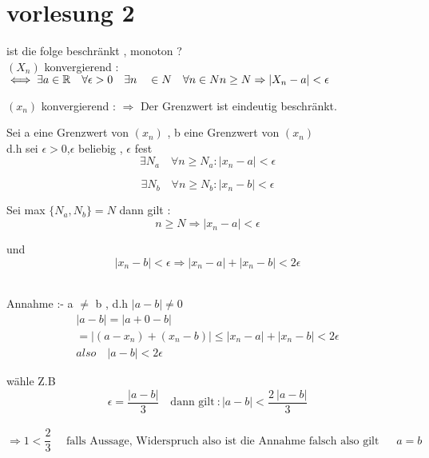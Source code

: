 \section{vorlesung 2}
\begin{text}
    ist die folge beschränkt , monoton ?\\

    $(X_n)$ konvergierend : $\iff \exists a \in\mathbb{R} \quad \forall \epsilon > 0 \quad \exists n \quad \in N \quad \forall n \in N \quad \\
    n \geq N \Rightarrow |X_n - a |< \epsilon $
\end{text}


\begin{theorem}

    $(x_n)$ konvergierend : $\Rightarrow$ Der Grenzwert ist eindeutig beschränkt.

\end{theorem}



\begin{beweis}
    Sei a eine Grenzwert von $(x_n)$ , b eine Grenzwert von $(x_n)$ \\
    d.h sei $\epsilon > 0$,$\epsilon$ beliebig , $\epsilon$ fest \\


    \begin{equation}
        \exists  N_a \quad \forall n \geq N_a : |x_n-a|< \epsilon
    \end{equation}
    

    \begin{equation}
        \exists  N_b \quad \forall n \geq N_b : |x_n-b|< \epsilon
    \end{equation}

    Sei max $\{N_a,N_b\}=N$
    dann gilt : \\
    \begin{equation}
        n \geq N \Rightarrow |x_n - a| < \epsilon
    \end{equation}
    
    und \begin{equation}
            |x_n -b| < \epsilon \Rightarrow |x_n -a|+|x_n - b|< 2\epsilon
    \end{equation}\\
\newpage    

    Annahme :- a $\neq$ b , d.h $|a-b|\neq 0 $
    \begin{gather*}
    |a-b|=|a+0-b|\\
    =|(a-x_n)+(x_n-b)| \leq |x_n - a|+|x_n-b|< 2 \epsilon \\
    also \quad |a - b|< 2 \epsilon
\end{gather*}

 
     wähle Z.B  \[\epsilon = \frac{|a-b|}{3}
        \quad
         \text{dann gilt}\ :|a-b|< \frac{2 \ |a-b|}{3}\]\\

        \[ \Rightarrow 1 < \frac{2}{3} \quad  \text{ falls  Aussage, Widerspruch  also  ist  die  Annahme  falsch  also  gilt }\ \quad a=b\]

\end{beweis}



